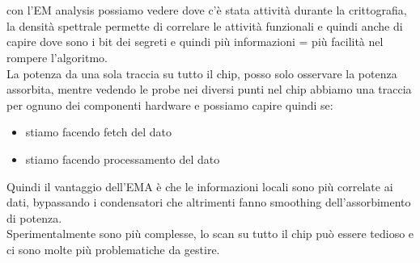 \documentclass[oneside, 12pt]{extbook}
\begin{document}
\\\\con l'EM analysis possiamo vedere dove c'è stata attività durante la crittografia, la densità spettrale permette di correlare le attività funzionali e quindi anche di capire dove sono i bit dei segreti e quindi più informazioni = più facilità nel rompere l'algoritmo.
\\La potenza da una sola traccia su tutto il chip, posso solo osservare la potenza assorbita, mentre vedendo le probe nei diversi punti nel chip abbiamo una traccia per ognuno dei componenti hardware e possiamo capire quindi se:
\begin{itemize}
	\item stiamo facendo fetch del dato
	\item stiamo facendo processamento del dato
\end{itemize}
Quindi il vantaggio dell'EMA è che le informazioni locali sono più correlate ai dati, bypassando i condensatori che altrimenti fanno smoothing dell'assorbimento di potenza.
\\Sperimentalmente sono più complesse, lo scan su tutto il chip può essere tedioso e ci sono molte più problematiche da gestire.
\end{document}
